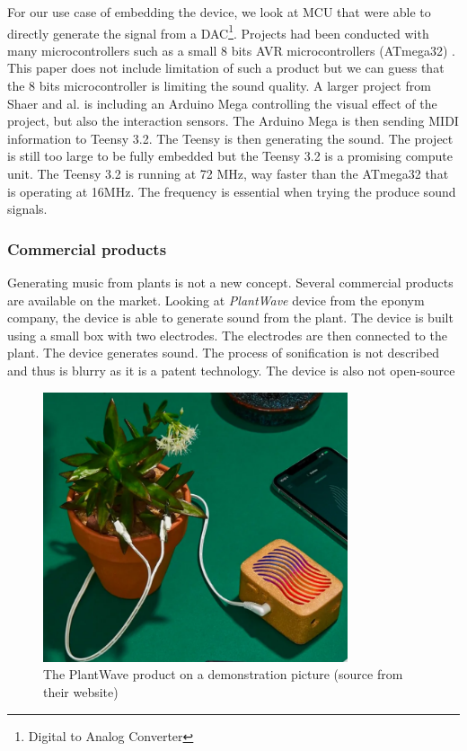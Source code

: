 For our use case of embedding the device, we look at MCU that were able to directly generate the signal 
from a DAC\footnote{Digital to Analog Converter}. Projects had been conducted with many microcontrollers such as a small
8 bits AVR microcontrollers (ATmega32) \cite{hussainAVRMicrocontrollerImplementation2011}. This paper does not include limitation of
such a product but we can guess that the 8 bits microcontroller is limiting the sound quality. A larger project from Shaer and al.
\cite{shaerInteractiveCapacitiveTouch2020} is including an Arduino Mega controlling the visual effect of the project,
but also the interaction sensors. The Arduino Mega is then sending MIDI information to Teensy 3.2. The Teensy is then 
generating the sound. The project is still too large to be fully embedded but the Teensy 3.2 is a promising compute unit.
The Teensy 3.2 is running at 72 MHz, way faster than the ATmega32 that is operating at 16MHz. The frequency is essential
when trying the produce sound signals.


\subsubsection{Commercial products}

Generating music from plants is not a new concept. Several commercial products are available on the market.
Looking at \textit{PlantWave} device from the eponym company, the device is able to generate sound from the plant. The device is
built using a small box with two electrodes. The electrodes are then connected to the plant. The device generates sound.
The process of sonification is not described and thus is blurry as it is a patent technology. The device is also not open-source

\begin{figure}[h!]
    \centering
    \includegraphics[width=0.8\textwidth]{images/plant_wave_product.png}
    \caption{The PlantWave product on a demonstration picture (source from their website)} 
    \vspace{0.1cm}
    \label{fig:plant_wave_product}
\end{figure}

